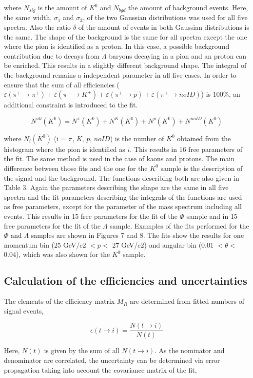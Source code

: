 where $N_{sig}$ is the amount of $K^0$ and $N_{bgd}$ the amount of background events. Here, the same width, $\sigma_1$ and $\sigma_2$, of the two Gaussian distributions
was used for all five spectra.
Also the ratio $\delta$ of the amount of events in both Gaussian distributions is the same. The shape of the background is the same for all spectra except the one where the pion
is identified as a proton. In this case, a possible background contribution due to decays from $\Lambda$ baryons decaying in a pion and an proton can be enriched. This results in
 a slightly different background shape. The integral of the background remains a independent parameter in all five cases. In order to ensure that the sum of all efficiencies
 ($\varepsilon(\pi^+ \rightarrow \pi^+)  + \varepsilon(\pi^+ \rightarrow K^+ ) + \varepsilon(\pi^+ \rightarrow p ) + \varepsilon(\pi^+ \rightarrow noID)$) is 100\%, an additional constraint is introduced to the fit.

\begin{equation}
  N^{all}(K^0) = N^{\pi}(K^0) + N^{K}(K^0) + N^{p}(K^0) + N^{noID}(K^0)
\end{equation}

where $N_i(K^0)$ (i = $\pi$, $K$, $p$, $noID$) is the number of $K^0$ obtained from the histogram where the pion is identified as $i$. This results in 16 free parameters of the fit.
The same method is used in the case of kaons and protons. The main difference between those fits and the one for the $K^0$ sample is the description of the signal and
the background. The functions describing both are also given in Table 3. Again the parameters describing the shape are the same in all five spectra and the fit parameters
 describing the integrals of the functions are used as free parameters, except for the parameter of the mass spectrum including all events. This results in 15 free
 parameters for the fit of the $\Phi$ sample and in 15 free parameters for the fit of the $\Lambda$ sample. Examples of the fits performed for the $\Phi$ and $\Lambda$ samples are shown in Figures
 7 and 8. The fits show the results for one momentum bin (25 GeV/c2 $< p <$ 27 GeV/c2) and angular bin (0.01 $< \theta <$ 0.04), which was also shown for the $K^0$ sample.

\subsection{Calculation of the efficiencies and uncertainties}

The elements of the efficiency matrix $M_R$ are determined from fitted numbers of signal events,

\begin{equation}
  \epsilon(t\rightarrow i) = \frac{N(t\rightarrow i)}{N(t)}
\end{equation}

Here, $N(t)$ is given by the sum of all $N(t \rightarrow i)$. As the nominator and denominator are correlated, the uncertainty can be determined via error propagation taking into
account the covariance matrix of the fit,

